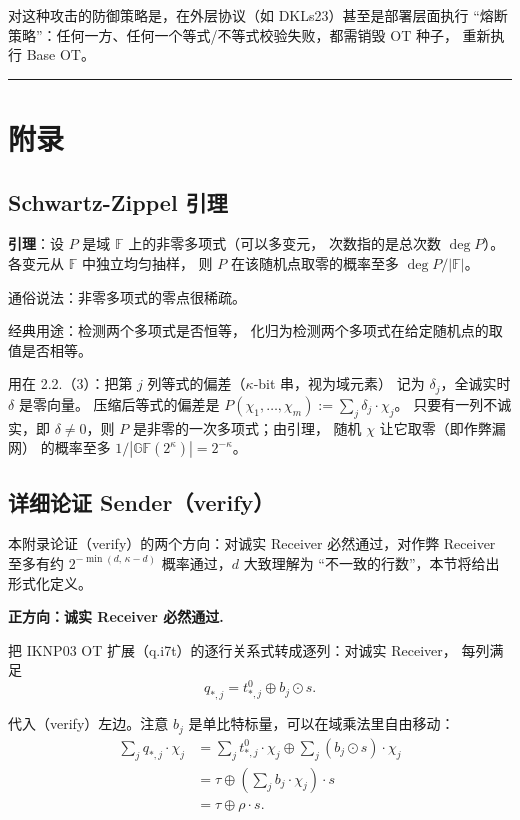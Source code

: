对这种攻击的防御策略是，在外层协议（如 DKLs23）甚至是部署层面执行
“熔断策略”：任何一方、任何一个等式/不等式校验失败，都需销毁 OT 种子，
重新执行 Base OT。

\begin{center}\rule{0.5\linewidth}{0.5pt}\end{center}

\section{附录}
\subsection{Schwartz-Zippel 引理}

\textbf{引理}：设 $P$ 是域 $\mathbb{F}$ 上的非零多项式（可以多变元，
次数指的是总次数 $\deg P$）。各变元从 $\mathbb{F}$ 中独立均匀抽样，
则 $P$ 在该随机点取零的概率至多 $\deg P / |\mathbb{F}|$。

通俗说法：非零多项式的零点很稀疏。

经典用途：检测两个多项式是否恒等，
化归为检测两个多项式在给定随机点的取值是否相等。

用在 2.2.（3）：把第 $j$ 列等式的偏差（$\kappa$-bit 串，视为域元素）
记为 $\delta_j$，全诚实时 $\delta$ 是零向量。
压缩后等式的偏差是 $P(\chi_1, \ldots, \chi_m) := \sum_j \delta_j \cdot \chi_j$。
只要有一列不诚实，即 $\delta \ne 0$，则 $P$ 是非零的一次多项式；由引理，
随机 $\chi$ 让它取零（即作弊漏网）
的概率至多 $1 / \left|\mathbb{GF}(2^\kappa)\right| = 2^{-\kappa}$。

\subsection{详细论证 Sender（verify）}

本附录论证（verify）的两个方向：对诚实 Receiver 必然通过，对作弊
Receiver 至多有约 $2^{-\min(d,\,\kappa-d)}$ 概率通过，$d$ 大致理解为
“不一致的行数”，本节将给出形式化定义。

\textbf{正方向：诚实 Receiver 必然通过.}

把 IKNP03 OT 扩展（q.i7t）的逐行关系式转成逐列：对诚实 Receiver，
每列满足
\begin{equation}\label{eq:02-kos15:q-j7t}
q_{*,j} = t^0_{*,j} \oplus b_j \odot s. \tag{q.j7t}
\end{equation}

代入（verify）左边。注意 $b_j$ 是单比特标量，可以在域乘法里自由移动：
\begin{align}\sum_j q_{*,j} \cdot \chi_j
&=
\sum_j t^0_{*,j} \cdot \chi_j
\oplus
\sum_j \left(b_j \odot s\right) \cdot \chi_j \\
&=
\tau \oplus \left(\sum_j b_j \cdot \chi_j\right) \cdot s \\
&=\tau \oplus \rho \cdot s.
\end{align}

